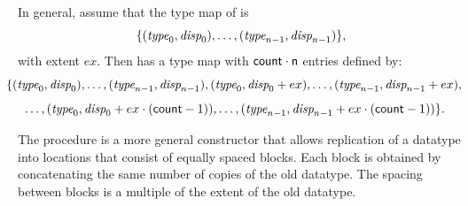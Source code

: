 In general,
assume that the type map of  is
\begin{displaymath}
\{ (\textrm{\itshape{type}}_0,\textrm{\itshape{disp}}_0), \ldots , (\textrm{\itshape{type}}_{n-1}, \textrm{\itshape{disp}}_{n-1}) \} ,
\end{displaymath}
with extent $ex$.
Then  has a type map with $\textsf{count} \cdot \textsf{n}$
entries defined by:
\begin{displaymath}
\hskip-1em\{ (\mword{type}_0, \mword{disp}_0), \ldots , (\mword{type}_{n-1}, \mword{disp}_{n-1}), %
(\mword{type}_0, \mword{disp}_0 +ex), \ldots ,(\mword{type}_{n-1}, \mword{disp}_{n-1} + ex),\\
\end{displaymath}
\begin{displaymath}
\hskip-1em\ldots,(\mword{type}_0, \mword{disp}_0 +ex \cdot(\mpicode{count}-1) ), \ldots ,%
(\mword{type}_{n-1} , \mword{disp}_{n-1} + ex \cdot (\mpicode{count}-1)) \} .
\end{displaymath}

The procedure
 is a more general constructor that
allows replication of a datatype
into locations that consist of equally spaced blocks.  Each block
is obtained by concatenating the same number of copies of the old datatype.
The spacing between blocks is a multiple of the extent of the old datatype.

